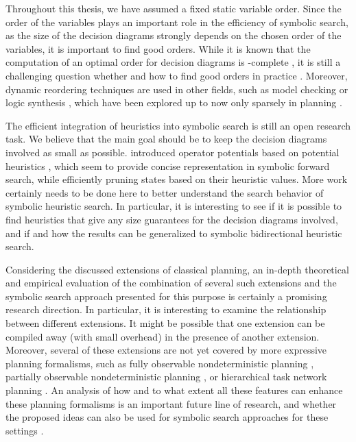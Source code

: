 Throughout this thesis, we have assumed a fixed static variable order.
Since the order of the variables plays an important role in the efficiency of symbolic search, as the size of the decision diagrams strongly depends on the chosen order of the variables, it is important to find good orders.
While it is known that the computation of an optimal order for decision diagrams is \coNP{}-complete \autocite{bryant-ieeecomp1986}, it is still a challenging question whether and how to find good orders in practice \autocite{kissmann-hoffmann-icaps2013,kissmann-hoffmann-jair2014}.
Moreover, dynamic reordering techniques \autocite{rudell-iccad1993} are used in other fields, such as model checking \autocite{yang-et-al-fmcad1998} or logic synthesis \autocite{scholl-et-al-tcad1999}, which have been explored up to now only sparsely in planning \autocite{kissmann-hoffmann-jair2014,kissmann-et-al-ipc2014}.

The efficient integration of heuristics into symbolic search is still an open research task.
We believe that the main goal should be to keep the decision diagrams involved as small as possible.
\textcite{fiser-et-al-icaps2021wshsdip} introduced operator potentials based on potential heuristics \autocite{pommerening-et-al-aaai2015}, which seem to provide concise representation in symbolic forward search, while efficiently pruning states based on their heuristic values.
More work certainly needs to be done here to better understand the search behavior of symbolic heuristic search.
In particular, it is interesting to see if it is possible to find heuristics that give any size guarantees for the decision diagrams involved, and if and how the results can be generalized to symbolic bidirectional heuristic search.

Considering the discussed extensions of classical planning, an in-depth theoretical and empirical evaluation of the combination of several such extensions and the symbolic search approach presented for this purpose is certainly a promising research direction.
In particular, it is interesting to examine the relationship between different extensions.
It might be possible that one extension can be compiled away (with small overhead) in the presence of another extension.
Moreover, several of these extensions are not yet covered by more expressive planning formalisms, such as
fully observable nondeterministic planning \autocite{cimatti-et-al-aij2003}, partially observable nondeterministic planning \autocite{bertoli-et-al-aij2006,speck-et-al-ki2015}, or hierarchical task network planning \autocite{erol-et-al-amai1996,geier-bercher-ijcai2011}.
An analysis of how and to what extent all these features can enhance these planning formalisms is an important future line of research, and whether the proposed ideas can also be used for symbolic search approaches for these settings \autocite{kissmann-edelkamp-ki2009,behnke-speck-aaai2021,bertoli-et-al-aij2006}.

